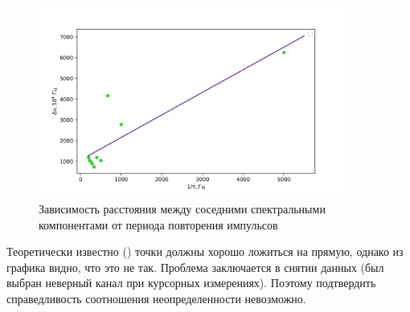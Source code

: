 \documentclass[a4paper,12pt]{article} %
\begin{document}
\begin{figure}[h!]
\begin{center}
\includegraphics[width=0.9\textwidth]{T(dnu)}
\caption{Зависимость расстояния между соседними спектральными компонентами от периода повторения импульсов} \label{dnu(T)_img}
\end{center}
\end{figure}

Теоретически известно (\cite{labnik}) точки должны хорошо ложиться на прямую, однако из графика видно, что это не так. Проблема заключается в снятии данных (был выбран неверный канал при курсорных измерениях). Поэтому подтвердить справедливость соотношения неопределенности невозможно. 
\end{document}
